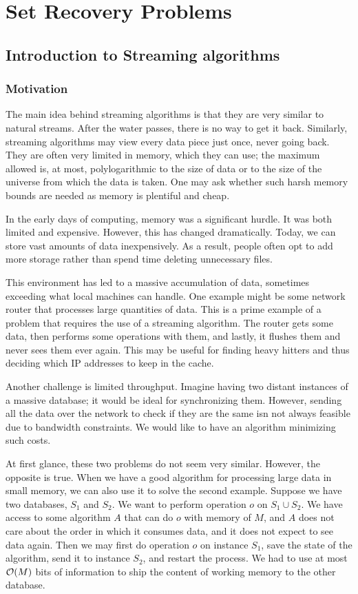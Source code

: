 \chapter{Set Recovery Problems}

\section{Introduction to Streaming algorithms}

\subsection{Motivation}
The main idea behind streaming algorithms is that they are very similar to natural streams. After the water passes, there is no way to get it back. Similarly, streaming algorithms may view every data piece just once, never going back. They are often very limited in memory, which they can use; the maximum allowed is, at most, polylogarithmic to the size of data or to the size of the universe from which the data is taken. One may ask whether such harsh memory bounds are needed as memory is plentiful and cheap.

In the early days of computing, memory was a significant hurdle. It was both limited and expensive. However, this has changed dramatically. Today, we can store vast amounts of data inexpensively. As a result, people often opt to add more storage rather than spend time deleting unnecessary files.

This environment has led to a massive accumulation of data, sometimes exceeding what local machines can handle. One example might be some network router that processes large quantities of data. This is a prime example of a problem that requires the use of a streaming algorithm. The router gets some data, then performs some operations with them, and lastly, it flushes them and never sees them ever again.  This may be useful for finding heavy hitters and thus deciding which IP addresses to keep in the cache.

Another challenge is limited throughput. Imagine having two distant instances of a massive database; it would be ideal for synchronizing them. However, sending all the data over the network to check if they are the same isn not always feasible due to bandwidth constraints. We would like to have an algorithm minimizing such costs. 

At first glance, these two problems do not seem very similar. However, the opposite is true. When we have a good algorithm for processing large data in small memory, we can also use it to solve the second example. 
 Suppose we have two databases, $S_1$ and $S_2$. We want to perform operation $o$ on $S_1 \cup S_2$. We have access to some algorithm $A$ that can do $o$ with memory of $M$, and $A$ does not care about the order in which it consumes data, and it does not expect to see data again. Then we may first do operation $o$ on instance $S_1$, save the state of the algorithm, send it to instance $S_2$, and restart the process. We had to use at most $\mathcal{O}(M)$ bits of information to ship the content of working memory to the other database.

